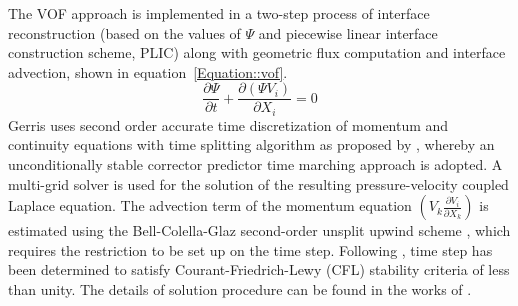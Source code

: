 \documentclass{jfm}
\begin{document}
The VOF approach is implemented in a two-step process of interface reconstruction (based on the values of $\Psi$ and piecewise linear interface construction scheme, PLIC) along with geometric flux computation and interface advection, shown in equation~\ref{Equation::vof}.
\begin{equation} \label{Equation::vof}
\frac{\partial \Psi}{\partial t} + \frac{\partial(\Psi V_i)}{\partial X_i} = 0
\end{equation}
Gerris uses second order accurate time discretization of momentum and continuity equations with time splitting algorithm as proposed by \cite{Chorin1968}, whereby an unconditionally stable corrector predictor time marching approach is adopted. A multi-grid solver is used for the solution of the resulting pressure-velocity coupled Laplace equation. The advection term of the momentum equation $\left(V_k\frac{\partial V_i}{\partial X_k}\right)$ is estimated using the Bell-Colella-Glaz second-order unsplit upwind scheme \citep{bell1989second}, which requires the restriction to be set up on the time step. Following \cite{popinet2009}, time step has been determined to satisfy Courant-Friedrich-Lewy (CFL) stability criteria of less than unity. The details of solution procedure can be found in the works of \cite{Popinet2003,popinet2009}.\\
\end{document}

